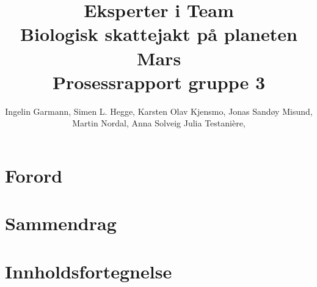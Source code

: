 \documentclass[DIV=calc, paper=a4, fontsize=12pt]{scrartcl}	 %
\title{Eksperter i Team \\ Biologisk skattejakt på planeten Mars \\ Prosessrapport gruppe 3} %
\author{Ingelin Garmann, Simen L. Hegge, Karsten Olav Kjensmo, Jonas Sandøy Misund, Martin Nordal, Anna Solveig Julia Testani\`{e}re, } %
\date{} %
\newcommand{\initial}[1]{ %
\lettrine[lines=2,lhang=0.3,nindent=0em]{
\color{DarkBlue}
{\textsf{#1}}}{}}
\begin{document}
\maketitle %

\thispagestyle{fancy} %





\section{Forord}

\begin{multicols}{2}

%

\end{multicols}


\section{Sammendrag}

\begin{multicols}{2}

\end{multicols}


\section{Innholdsfortegnelse}

\begin{multicols}{2}

\end{multicols}

\end{document}
